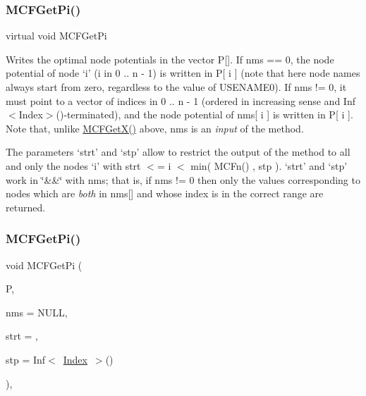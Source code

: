 \subsubsection{\texorpdfstring{M\+C\+F\+Get\+Pi()}{MCFGetPi()}\hspace{0.1cm}{\footnotesize\ttfamily [2/3]}}
{\footnotesize\ttfamily virtual void M\+C\+F\+Get\+Pi}

Writes the optimal node potentials in the vector P\mbox{[}\mbox{]}. If nms == 0, the node potential of node `i' (i in 0 .. n -\/ 1) is written in P\mbox{[} i \mbox{]} (note that here node names always start from zero, regardless to the value of U\+S\+E\+N\+A\+M\+E0). If nms != 0, it must point to a vector of indices in 0 .. n -\/ 1 (ordered in increasing sense and Inf$<$\+Index$>$()-\/terminated), and the node potential of nms\mbox{[} i \mbox{]} is written in P\mbox{[} i \mbox{]}. Note that, unlike \mbox{\hyperlink{class_m_c_f_class_a4eb307e0707adaef99bb0e08c9e10eb8}{M\+C\+F\+Get\+X()}} above, nms is an {\itshape input} of the method.

The parameters `strt' and `stp' allow to restrict the output of the method to all and only the nodes `i' with strt $<$= i $<$ min( M\+C\+Fn() , stp ). `strt' and `stp' work in \char`\"{}\&\&\char`\"{} with nms; that is, if nms != 0 then only the values corresponding to nodes which are {\itshape both} in nms\mbox{[}\mbox{]} and whose index is in the correct range are returned. \mbox{\label{class_m_c_f_simplex_abb97afaf7df33019f1b728138a254d6d}} 
\subsubsection{\texorpdfstring{M\+C\+F\+Get\+Pi()}{MCFGetPi()}\hspace{0.1cm}{\footnotesize\ttfamily [3/3]}}
{\footnotesize\ttfamily void M\+C\+F\+Get\+Pi (\begin{DoxyParamCaption}\item[{\mbox{\hyperlink{class_m_c_f_class_a62409402be4e4b301e1a568f99f877be}{C\+Row}}}]{P,  }\item[{\mbox{\hyperlink{class_m_c_f_class_a81575b2d4e4d5636b17170432150ae69}{c\+Index\+\_\+\+Set}}}]{nms = {\ttfamily NULL},  }\item[{\mbox{\hyperlink{class_m_c_f_class_a76aaabb20535c51a2752b93f6c38fe54}{c\+Index}}}]{strt = {},  }\item[{\mbox{\hyperlink{class_m_c_f_class_ad53d6229d7ec28555a9c9c2fd9abf773}{Index}}}]{stp = {\ttfamily Inf$<$~\mbox{\hyperlink{class_m_c_f_class_ad53d6229d7ec28555a9c9c2fd9abf773}{Index}}~$>$()} }\end{DoxyParamCaption})\hspace{0.3cm}{\ttfamily [override]}, {\ttfamily [virtual]}}

